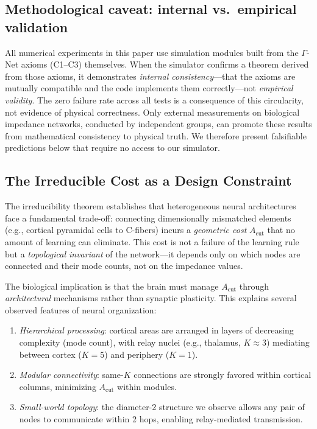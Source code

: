 \documentclass[aps,pre,twocolumn,superscriptaddress,floatfix]{revtex4-2}
\newcommand{\Acut}{A_{\text{cut}}}
\begin{document}
\subsection{Methodological caveat: internal vs.\ empirical validation}

All numerical experiments in this paper use simulation modules
built from the $\Gamma$-Net axioms (C1--C3) themselves.
When the simulator confirms a theorem derived from those axioms,
it demonstrates \emph{internal consistency}---that the axioms
are mutually compatible and the code implements them correctly---not
\emph{empirical validity}.
The zero failure rate across all tests is a consequence of this
circularity, not evidence of physical correctness.
Only external measurements on biological impedance networks,
conducted by independent groups, can promote these results
from mathematical consistency to physical truth.
We therefore present falsifiable predictions below that require
no access to our simulator.

\subsection{The Irreducible Cost as a Design Constraint}

The irreducibility theorem establishes that heterogeneous
neural architectures face a fundamental trade-off:
connecting dimensionally mismatched elements
(e.g., cortical pyramidal cells to C-fibers) incurs a
\emph{geometric cost} $\Acut$ that no amount of learning can
eliminate.
This cost is not a failure of the learning rule but a
\emph{topological invariant} of the network---it depends only on
which nodes are connected and their mode counts, not on the
impedance values.

The biological implication is that the brain must manage $\Acut$
through \emph{architectural} mechanisms rather than synaptic
plasticity.
This explains several observed features of neural organization:
\begin{enumerate}
\item \emph{Hierarchical processing}:
cortical areas are arranged in layers of decreasing complexity
(mode count), with relay nuclei (e.g., thalamus, $K \approx 3$)
mediating between cortex ($K = 5$) and periphery ($K = 1$).
\item \emph{Modular connectivity}:
same-$K$ connections are strongly favored within cortical
columns, minimizing $\Acut$ within modules.
\item \emph{Small-world topology}:
the diameter-2 structure we observe allows any pair of nodes
to communicate within 2 hops, enabling relay-mediated
transmission.
\end{enumerate}
\end{document}
